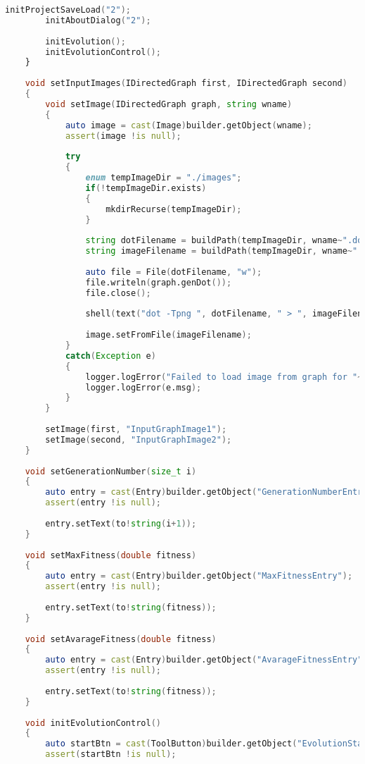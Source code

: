 \documentclass[russian,utf8,emptystyle]{eskdtext}
\begin{document}
\begin{lstlisting}[language=D]
        initProjectSaveLoad("2");
        initAboutDialog("2");
        
        initEvolution();
        initEvolutionControl();
    }
    
    void setInputImages(IDirectedGraph first, IDirectedGraph second)
    {
        void setImage(IDirectedGraph graph, string wname)
        {
            auto image = cast(Image)builder.getObject(wname);
            assert(image !is null);
            
            try
            {
                enum tempImageDir = "./images";
                if(!tempImageDir.exists)
                {
                    mkdirRecurse(tempImageDir);
                }
                
                string dotFilename = buildPath(tempImageDir, wname~".dot");
                string imageFilename = buildPath(tempImageDir, wname~".png");
                
                auto file = File(dotFilename, "w"); 
                file.writeln(graph.genDot());
                file.close();
                
                shell(text("dot -Tpng ", dotFilename, " > ", imageFilename));
                
                image.setFromFile(imageFilename);
            }
            catch(Exception e)
            {
                logger.logError("Failed to load image from graph for "~wname);
                logger.logError(e.msg);
            }
        }
        
        setImage(first, "InputGraphImage1");
        setImage(second, "InputGraphImage2");
    }
    
    void setGenerationNumber(size_t i)
    {
    	auto entry = cast(Entry)builder.getObject("GenerationNumberEntry");
    	assert(entry !is null);
    	
    	entry.setText(to!string(i+1));
    }
    
    void setMaxFitness(double fitness)
    {
    	auto entry = cast(Entry)builder.getObject("MaxFitnessEntry");
    	assert(entry !is null);
    	
    	entry.setText(to!string(fitness));
    }
    
    void setAvarageFitness(double fitness)
    {
    	auto entry = cast(Entry)builder.getObject("AvarageFitnessEntry");
    	assert(entry !is null);
    	
    	entry.setText(to!string(fitness));
    }
    
    void initEvolutionControl()
    {
        auto startBtn = cast(ToolButton)builder.getObject("EvolutionStartButton");
        assert(startBtn !is null);
        

\end{lstlisting}
\end{document}
